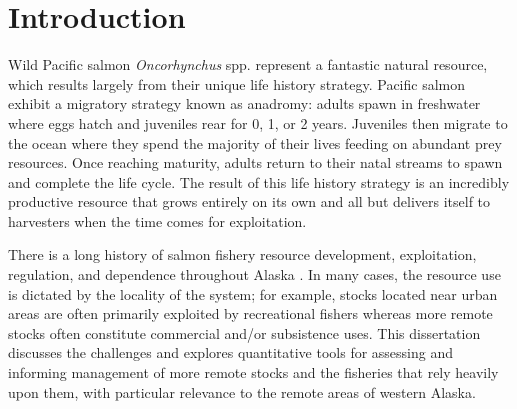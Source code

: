 \documentclass[12pt,]{book}
\theoremstyle{definition}
\theoremstyle{definition}
\theoremstyle{definition}
\theoremstyle{remark}
\begin{document}
\begin{romanpages}
\begin{acknowledgments}
\end{acknowledgments}

\newpage

\begin{singlespace}
	\tableofcontents
	\clearpage
	\listoffigures
	\clearpage
	\listoftables
\end{singlespace}

\end{romanpages}        %

\normalem       %


\setlength{\parskip}{0pt plus 0pt minus 0pt}

\doublespacing

\chapter{Introduction}\label{ch1}

\noindent
Wild Pacific salmon \emph{Oncorhynchus} spp. represent a fantastic
natural resource, which results largely from their unique life history
strategy. Pacific salmon exhibit a migratory strategy known as anadromy:
adults spawn in freshwater where eggs hatch and juveniles rear for 0, 1,
or 2 years. Juveniles then migrate to the ocean where they spend the
majority of their lives feeding on abundant prey resources. Once
reaching maturity, adults return to their natal streams to spawn and
complete the life cycle. The result of this life history strategy is an
incredibly productive resource that grows entirely on its own and all
but delivers itself to harvesters when the time comes for exploitation.

There is a long history of salmon fishery resource development,
exploitation, regulation, and dependence throughout Alaska
\citep{cooley-1963}. In many cases, the resource use is dictated by the
locality of the system; for example, stocks located near urban areas are
often primarily exploited by recreational fishers whereas more remote
stocks often constitute commercial and/or subsistence uses. This
dissertation discusses the challenges and explores quantitative tools
for assessing and informing management of more remote stocks and the
fisheries that rely heavily upon them, with particular relevance to the
remote areas of western Alaska.
\end{document}
